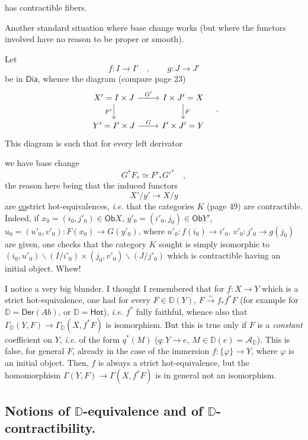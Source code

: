 \documentclass[11pt,leqno]{article}
\newcommand{\printedpage}[1]{\marginpar{\footnotesize p.~#1}}
\newcommand{\msp}[1]{\marginpar{\footnotesize [#1]}}
\newcommand{\DD}{\mathbb{D}}
\newcommand{\cA}{\mathcal{A}}
\newcommand{\Dia}{\mathsf{Dia}}
\newcommand{\Ob}{\mathsf{Ob}}
\newcommand{\Hot}{\mathsf{Hot}}
\newcommand{\isoto}{\overset{\sim}{\to}}
\begin{document}
\printedpage{34}
\noindent has contractible fibers.

Another standard situation where base change works (but where the functors involved have no reason to be proper or smooth).

Let
\[
f : I \longrightarrow I' \quad , \qquad g : J \longrightarrow J'
\]
be in $\Dia$, whence the diagram (compare page 23)
\[
\begin{tikzcd}
X' = I \times J \arrow[r, "G'"] \arrow[d, "F'"'] & I \times J' = X \arrow[d, "F"] \\
Y' = I' \times J \arrow[r, "G"] & I' \times J' = Y
\end{tikzcd}
\quad .
\]
This diagram is such that for every left derivator

\noindent\msp{page 60}

\noindent we have base change
\[
G^*F_* \simeq F'_*{G'}^* \quad ,
\]
the reason here being that the induced functors
\[
X'/y' \longrightarrow X/y
\]
are \underline{\underline{co}}strict hot-equivalences, \textit{i.e.} that the categories $K$ (page 49) are contractible. Indeed, if $x_0 = (i_0, j'_0) \in \Ob X$, $y'_0 = (i'_0, j_0) \in \Ob Y'$, $u_0 = (u'_0, v'_0) : F(x_0) \to G(y'_0)$, where $u'_0 : f(i_0) \to i'_0$, $v'_0 : j'_0 \to g(j_0)$ are given, one checks that the category $K$ sought is simply isomorphic to $(i_0, u'_0)\backslash(I/i'_0) \times (j_0, v'_0)\backslash(J/j'_0)$ which is contractible having an initial object. Whew!

I notice a very big blunder. I thought I remembered that for $f : X \to Y$ which is a strict hot-equivalence, one had for every $F \in \DD(Y)$, $F \isoto f_*f^*F$ (for example for $\DD = \mathsf{Der}(\mathit{Ab})$, or $\DD = \Hot$), \textit{i.e.} $f^*$ fully faithful, whence also that $\Gamma_{\DD}(Y, F) \to \Gamma_{\DD}(X, f^*F)$ is isomorphism. But this is true only if $F$ is a \textit{constant} coefficient on $Y$, \textit{i.e.} of the form $q^*(M)$ ($q : Y \to e$, $M \in \DD(e) = \cA_{\DD}$). This is false, for general $F$, already in the case of the immersion $f : \{\varphi\} \to Y$, where $\varphi$ is an initial object. Then, $f$ is always a strict hot-equivalence, but the homomorphism $\Gamma(Y, F) \to \Gamma(X, f^*F)$ is in general not an isomorphism.

\clearpage
\printedpage{35}
\noindent\msp{page 61}

\subsection*{Notions of $\mathbb{D}$-equivalence and of $\mathbb{D}$-contractibility.}
\end{document}

